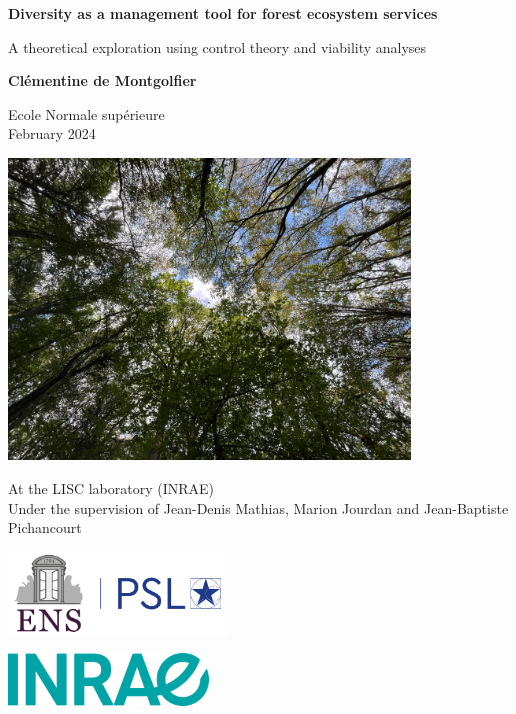 \begin{titlepage}
    \begin{center}
        
        \Huge
        \textbf{Diversity as a management tool for forest ecosystem services}
 
        \LARGE
        A theoretical exploration using control theory and viability analyses
             
        \vspace{0.5cm}

        \Large  
        \textbf{Clémentine de Montgolfier}

        \large  
        Ecole Normale supérieure\\
        February 2024

        \vspace{0.5cm}
        
        \includegraphics[height=8cm]{Figure/forest.jpg}

        \vspace{0.5cm}

        \large
        At the LISC laboratory (INRAE)\\
        Under the supervision of Jean-Denis Mathias, Marion Jourdan and Jean-Baptiste Pichancourt

        \begin{minipage}[b]{0.5\textwidth}
            \vspace{1cm}
            \includegraphics[height=2.2cm]{Figure/ENS_logo.png}
        \end{minipage}%
        \begin{minipage}[b]{0.5\textwidth}
            \hfill
            \includegraphics[height=1.4cm]{Figure/INRAE_logo.png}
        \end{minipage}

    \end{center}
\end{titlepage}